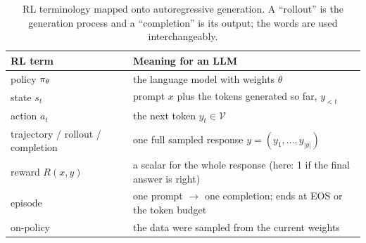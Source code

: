 \begin{table}[ht]
\centering\small
\begin{tabularx}{\linewidth}{@{}lX@{}}
\toprule
RL term & Meaning for an LLM\\
\midrule
policy $\pi_\theta$ & the language model with weights $\theta$\\
state $s_t$ & prompt $x$ plus the tokens generated so far, $y_{<t}$\\
action $a_t$ & the next token $y_t\in\mathcal{V}$\\
trajectory / rollout / completion & one full sampled response $y=(y_1,\dots,y_{|y|})$\\
reward $R(x,y)$ & a scalar for the whole response (here: 1 if the final answer is right)\\
episode & one prompt $\to$ one completion; ends at EOS or the token budget\\
on-policy & the data were sampled from the current weights\\
\bottomrule
\end{tabularx}
\caption{RL terminology mapped onto autoregressive generation. A ``rollout'' is the
generation process and a ``completion'' is its output; the words are used interchangeably.}
\label{tab:grpo:vocab}
\end{table}

